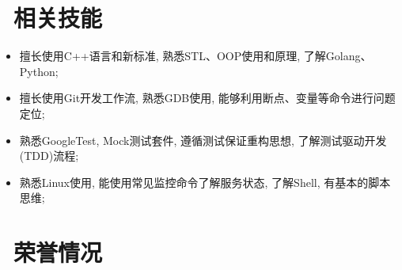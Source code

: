 \documentclass{resume}
\begin{document}
\section{\faCogs\ 相关技能}
\begin{itemize}
  \item 擅长使用C++语言和新标准, 熟悉STL、OOP使用和原理, 了解Golang、Python;
  \item 擅长使用Git开发工作流, 熟悉GDB使用, 能够利用断点、变量等命令进行问题定位;
  \item 熟悉GoogleTest, Mock测试套件, 遵循测试保证重构思想, 了解测试驱动开发(TDD)流程;
  \item 熟悉Linux使用, 能使用常见监控命令了解服务状态, 了解Shell, 有基本的脚本思维;
\end{itemize}

\section{\faHeartO\ 荣誉情况}
\end{document}
